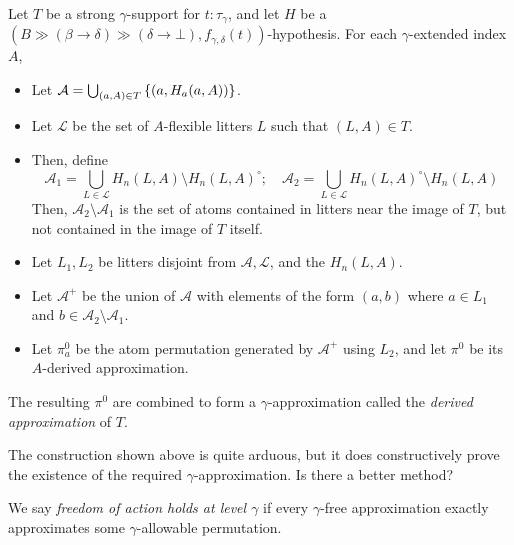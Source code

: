 \documentclass{article}
\begin{document}
\begin{definition}
    Let \( T \) be a strong \( \gamma \)-support for \( t : \tau_\gamma \), and let \( H \) be a \( (B \gg (\beta \longrightarrow \delta) \gg (\delta \longrightarrow \bot), f_{\gamma,\delta}(t)) \)-hypothesis.
    For each \( \gamma \)-extended index \( A \),
    \begin{itemize}
        \item Let \( \mathcal A = \bigcup_{(a, A) \in T} \qty{(a, H_a(a, A))} \).
        \item Let \( \mathcal L \) be the set of \( A \)-flexible litters \( L \) such that \( (L, A) \in T \).
        \item Then, define
        \[ \mathcal A_1 = \bigcup_{L \in \mathcal L} H_n(L, A) \setminus H_n(L, A)^\circ;\quad \mathcal A_2 = \bigcup_{L \in \mathcal L} H_n(L, A)^\circ \setminus H_n(L, A) \]
        Then, \( \mathcal A_2 \setminus \mathcal A_1 \) is the set of atoms contained in litters near the image of \( T \), but not contained in the image of \( T \) itself.
        \item Let \( L_1, L_2 \) be litters disjoint from \( \mathcal A, \mathcal L \), and the \( H_n(L, A) \).
        \item Let \( \mathcal A^+ \) be the union of \( \mathcal A \) with elements of the form \( (a, b) \) where \( a \in L_1 \) and \( b \in \mathcal A_2 \setminus \mathcal A_1 \).
        \item Let \( \pi^0_a \) be the atom permutation generated by \( \mathcal A^+ \) using \( L_2 \), and let \( \pi^0 \) be its \( A \)-derived approximation.
    \end{itemize}
    The resulting \( \pi^0 \) are combined to form a \( \gamma \)-approximation called the \emph{derived approximation} of \( T \).
\end{definition}
\begin{remark}
    The construction shown above is quite arduous, but it does constructively prove the existence of the required \( \gamma \)-approximation.
    Is there a better method?
\end{remark}
\begin{definition}
    We say \emph{freedom of action holds at level \( \gamma \)} if every \( \gamma \)-free approximation exactly approximates some \( \gamma \)-allowable permutation.
\end{definition}
\end{document}
